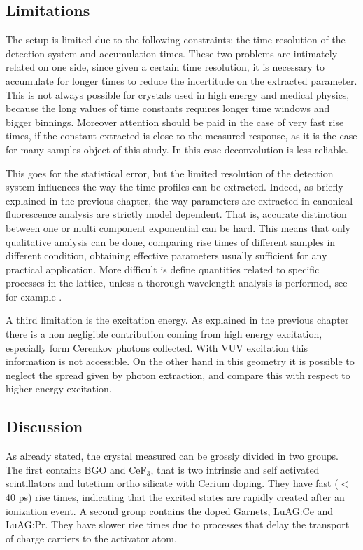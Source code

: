 \subsection{Limitations}

The setup is limited due to the following constraints: the time resolution of the detection system and accumulation times. 
These two problems are intimately related on one side, since given a certain time resolution, it is necessary to accumulate for longer times to reduce the incertitude on the extracted parameter. This is not always possible for crystals used in high energy and medical physics, because the long values of time constants requires longer time windows and bigger binnings.
Moreover attention should be paid in the case of very fast rise times, if the constant extracted is close to the measured response, as it is the case for many samples object of this study. In this case deconvolution is less reliable.

This goes for the statistical error, but the limited resolution of the detection system influences the way the time profiles can be extracted. 
Indeed, as briefly explained in the previous chapter, the way parameters are extracted in canonical fluorescence analysis are strictly model dependent. That is, accurate distinction between one or multi component exponential can be hard.
This means that only qualitative analysis can be done, comparing rise times of different samples in different condition, obtaining effective parameters usually sufficient for any practical application.
More difficult is define quantities related to specific processes in the lattice, unless a thorough wavelength analysis is performed, see for example \cite{Belsky2013}.

A third limitation is the excitation energy. As explained in the previous chapter there is a non negligible contribution coming from high energy excitation, especially form Cerenkov photons collected. With VUV excitation this information is not accessible. On the other hand in this geometry it is possible to neglect the spread given by photon extraction, and compare this with respect to higher energy excitation. 

\subsection{Discussion}
As already stated, the crystal measured can be grossly divided in two groups.
The first contains BGO and CeF$_{3}$, that is two intrinsic and self activated scintillators and lutetium ortho silicate with Cerium doping. They have fast ($<$40 ps) rise times, indicating that the excited states are rapidly created after an ionization event.
A second group contains the doped Garnets, LuAG:Ce and LuAG:Pr. They have slower rise times due to processes that delay the transport of charge carriers to the activator atom.

